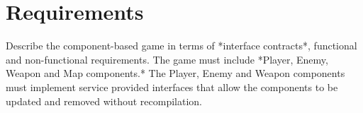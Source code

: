 \section{Requirements}
Describe the component-based game in terms of *interface contracts*, functional and non-functional requirements.
The game must include *Player, Enemy, Weapon and Map components.*
The Player, Enemy and Weapon components must implement service provided interfaces that allow the components to be updated and removed without recompilation.
